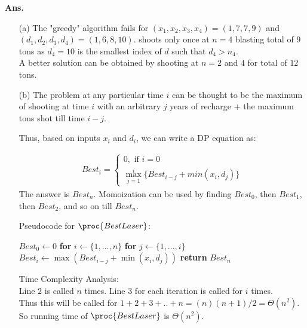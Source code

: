 \documentclass[11pt]{article}
\begin{document}
\noindent \textbf{Ans.}
\begin{enumerate}
\item[(a)] The "greedy" algorithm fails for $(x_1,x_2,x_3,x_4)=(1,7,7,9)$ and $(d_1,d_2,d_3,d_4) = (1,6,8,10)$.  shoots only once at $n=4$ blasting total of $9$ tons as $d_4=10$ is the smallest index of $d$ such that $d_4>n_4$.\\
A better solution can be obtained by shooting at $n=2$ and $4$ for total of $12$ tons.

\newpage

\item[(b)] 
The problem at any particular time $i$ can be thought to be the maximum of shooting at time $i$ with an arbitrary $j$ years of recharge + the maximum tons shot till time $i-j$.

Thus, based on inputs $x_i$ and $d_i$, we can write a DP equation as:

\begin{equation}
    \begin{split}
       Best_i = 
       \begin{cases}
            0, \text{ if } i=0\\
            \max_{j=1}^{i} \{Best_{i-j} + min(x_i, d_{j})\}
        \end{cases}
    \end{split}
\end{equation}
The answer is $Best_n$. 
Momoization can be used by finding $Best_0$, then $Best_1$, then $Best_2$, and so on till $Best_n$.

\hfill

Pseudocode for $\proc{BestLaser}$:
 \begin{codebox}
\li $Best_0 \leftarrow 0$
\li \textbf{for} $i \leftarrow \{1, ..., n\}$
\li \quad \textbf{for} $j \leftarrow \{1, ..., i\}$
\li \quad \quad $Best_i \leftarrow \max(Best_{i-j} + \min(x_i, d_{j}))$
\li \textbf{return} $Best_n$
\end{codebox}

Time Complexity Analysis:\\
Line $2$ is called $n$ times. Line $3$ for each iteration is called for $i$ times.\\ Thus this will be called for $1+2+3+..+n = (n)(n+1)/2 = \Theta(n^2)$.\\
So running time of $\proc{BestLaser}$ is $\Theta(n^2)$.

\end{enumerate}
\newpage
\end{document}
